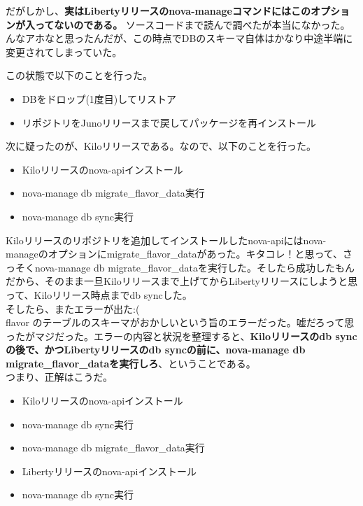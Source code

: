 \documentclass[9pt,b5paper,tombo,openany]{jsbook}
\begin{document}
だがしかし、\textbf{実はLibertyリリースのnova-manageコマンドにはこのオプションが入ってないのである。} ソースコードまで読んで調べたが本当になかった。んなアホなと思ったんだが、この時点でDBのスキーマ自体はかなり中途半端に変更されてしまっていた。

\noindent
この状態で以下のことを行った。

\begin{itemize}
	\item DBをドロップ(1度目)してリストア
	\item リポジトリをJunoリリースまで戻してパッケージを再インストール
\end{itemize}

\noindent
次に疑ったのが、Kiloリリースである。なので、以下のことを行った。

\begin{itemize}
	\item Kiloリリースのnova-apiインストール
	\item nova-manage db migrate\_flavor\_data実行
	\item nova-manage db sync実行
\end{itemize}

Kiloリリースのリポジトリを追加してインストールしたnova-apiにはnova-manageのオプションにmigrate\_flavor\_dataがあった。キタコレ！と思って、さっそくnova-manage db migrate\_flavor\_dataを実行した。そしたら成功したもんだから、そのまま一旦Kiloリリースまで上げてからLibertyリリースにしようと思って、Kiloリリース時点までdb syncした。\\[1ex]

\noindent
そしたら、またエラーが出た:(\\[1ex]

flavor のテーブルのスキーマがおかしいという旨のエラーだった。嘘だろって思ったがマジだった。エラーの内容と状況を整理すると、\textbf{Kiloリリースのdb syncの後で、かつLibertyリリースのdb syncの前に、nova-manage db migrate\_flavor\_dataを実行しろ}、ということである。\\[1ex]

\noindent
つまり、正解はこうだ。

\begin{itemize}
	\item Kiloリリースのnova-apiインストール
	\item nova-manage db sync実行
	\item nova-manage db migrate\_flavor\_data実行
	\item Libertyリリースのnova-apiインストール
	\item nova-manage db sync実行
\end{itemize}
\end{document}
